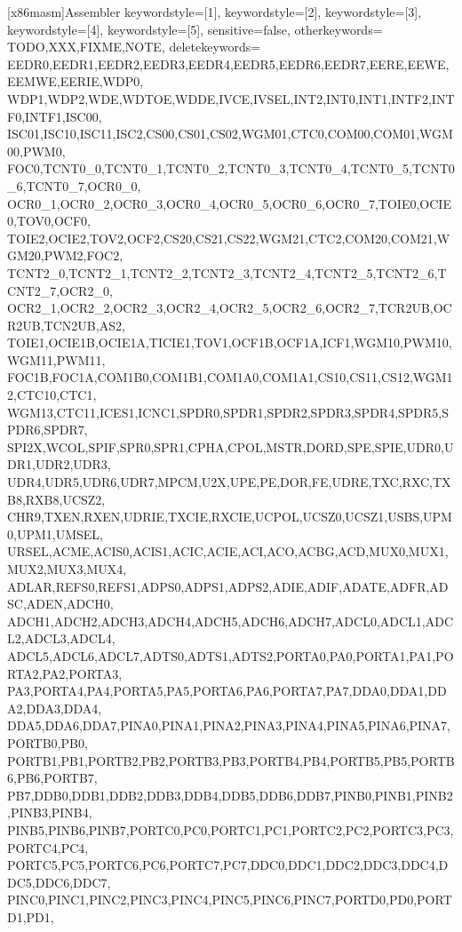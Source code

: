 [x86masm]{Assembler}
{
    keywordstyle=[1]{\color{Black}},%
    keywordstyle=[2]{\color{ForestGreen}},%
    keywordstyle=[3]{\color{BurntOrange}},%
    keywordstyle=[4]{\color{MidnightBlue}},%
    keywordstyle=[5]{\color{Violet}},%
    sensitive=false,%
    otherkeywords=
    {TODO,XXX,FIXME,NOTE},
    deletekeywords=
    {EEDR0,EEDR1,EEDR2,EEDR3,EEDR4,EEDR5,EEDR6,EEDR7,EERE,EEWE,EEMWE,EERIE,WDP0,
    WDP1,WDP2,WDE,WDTOE,WDDE,IVCE,IVSEL,INT2,INT0,INT1,INTF2,INTF0,INTF1,ISC00,
    ISC01,ISC10,ISC11,ISC2,CS00,CS01,CS02,WGM01,CTC0,COM00,COM01,WGM00,PWM0,
    FOC0,TCNT0_0,TCNT0_1,TCNT0_2,TCNT0_3,TCNT0_4,TCNT0_5,TCNT0_6,TCNT0_7,OCR0_0,
    OCR0_1,OCR0_2,OCR0_3,OCR0_4,OCR0_5,OCR0_6,OCR0_7,TOIE0,OCIE0,TOV0,OCF0,
    TOIE2,OCIE2,TOV2,OCF2,CS20,CS21,CS22,WGM21,CTC2,COM20,COM21,WGM20,PWM2,FOC2,
    TCNT2_0,TCNT2_1,TCNT2_2,TCNT2_3,TCNT2_4,TCNT2_5,TCNT2_6,TCNT2_7,OCR2_0,
    OCR2_1,OCR2_2,OCR2_3,OCR2_4,OCR2_5,OCR2_6,OCR2_7,TCR2UB,OCR2UB,TCN2UB,AS2,
    TOIE1,OCIE1B,OCIE1A,TICIE1,TOV1,OCF1B,OCF1A,ICF1,WGM10,PWM10,WGM11,PWM11,
    FOC1B,FOC1A,COM1B0,COM1B1,COM1A0,COM1A1,CS10,CS11,CS12,WGM12,CTC10,CTC1,
    WGM13,CTC11,ICES1,ICNC1,SPDR0,SPDR1,SPDR2,SPDR3,SPDR4,SPDR5,SPDR6,SPDR7,
    SPI2X,WCOL,SPIF,SPR0,SPR1,CPHA,CPOL,MSTR,DORD,SPE,SPIE,UDR0,UDR1,UDR2,UDR3,
    UDR4,UDR5,UDR6,UDR7,MPCM,U2X,UPE,PE,DOR,FE,UDRE,TXC,RXC,TXB8,RXB8,UCSZ2,
    CHR9,TXEN,RXEN,UDRIE,TXCIE,RXCIE,UCPOL,UCSZ0,UCSZ1,USBS,UPM0,UPM1,UMSEL,
    URSEL,ACME,ACIS0,ACIS1,ACIC,ACIE,ACI,ACO,ACBG,ACD,MUX0,MUX1,MUX2,MUX3,MUX4,
    ADLAR,REFS0,REFS1,ADPS0,ADPS1,ADPS2,ADIE,ADIF,ADATE,ADFR,ADSC,ADEN,ADCH0,
    ADCH1,ADCH2,ADCH3,ADCH4,ADCH5,ADCH6,ADCH7,ADCL0,ADCL1,ADCL2,ADCL3,ADCL4,
    ADCL5,ADCL6,ADCL7,ADTS0,ADTS1,ADTS2,PORTA0,PA0,PORTA1,PA1,PORTA2,PA2,PORTA3,
    PA3,PORTA4,PA4,PORTA5,PA5,PORTA6,PA6,PORTA7,PA7,DDA0,DDA1,DDA2,DDA3,DDA4,
    DDA5,DDA6,DDA7,PINA0,PINA1,PINA2,PINA3,PINA4,PINA5,PINA6,PINA7,PORTB0,PB0,
    PORTB1,PB1,PORTB2,PB2,PORTB3,PB3,PORTB4,PB4,PORTB5,PB5,PORTB6,PB6,PORTB7,
    PB7,DDB0,DDB1,DDB2,DDB3,DDB4,DDB5,DDB6,DDB7,PINB0,PINB1,PINB2,PINB3,PINB4,
    PINB5,PINB6,PINB7,PORTC0,PC0,PORTC1,PC1,PORTC2,PC2,PORTC3,PC3,PORTC4,PC4,
    PORTC5,PC5,PORTC6,PC6,PORTC7,PC7,DDC0,DDC1,DDC2,DDC3,DDC4,DDC5,DDC6,DDC7,
    PINC0,PINC1,PINC2,PINC3,PINC4,PINC5,PINC6,PINC7,PORTD0,PD0,PORTD1,PD1,
}}
